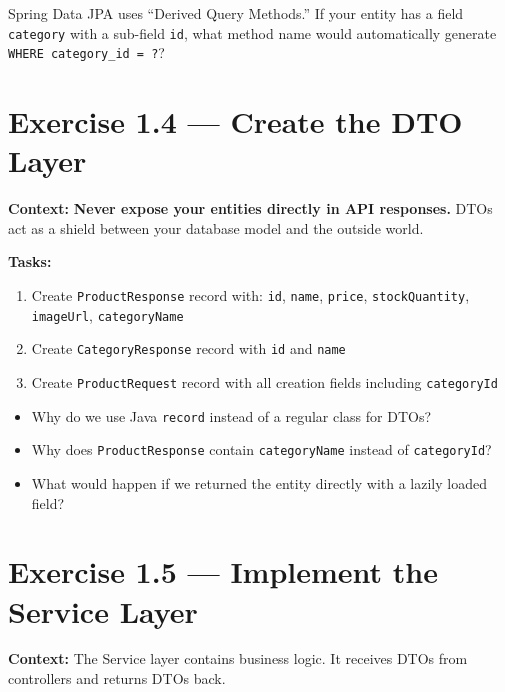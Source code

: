 \documentclass[12pt,a4paper]{report}
\begin{document}
\begin{thinkbox}
Spring Data JPA uses ``Derived Query Methods.'' If your entity has a field \texttt{category} with a sub-field \texttt{id}, what method name would automatically generate \texttt{WHERE category\_id = ?}?
\end{thinkbox}

\section{Exercise 1.4 --- Create the DTO Layer}

\textbf{Context:} \textbf{Never expose your entities directly in API responses.} DTOs act as a shield between your database model and the outside world.

\textbf{Tasks:}
\begin{enumerate}
    \item Create \texttt{ProductResponse} record with: \texttt{id}, \texttt{name}, \texttt{price}, \texttt{stockQuantity}, \texttt{imageUrl}, \texttt{categoryName}
    \item Create \texttt{CategoryResponse} record with \texttt{id} and \texttt{name}
    \item Create \texttt{ProductRequest} record with all creation fields including \texttt{categoryId}
\end{enumerate}

\begin{thinkbox}
\begin{itemize}
    \item Why do we use Java \texttt{record} instead of a regular class for DTOs?
    \item Why does \texttt{ProductResponse} contain \texttt{categoryName} instead of \texttt{categoryId}?
    \item What would happen if we returned the entity directly with a lazily loaded field?
\end{itemize}
\end{thinkbox}

\section{Exercise 1.5 --- Implement the Service Layer}

\textbf{Context:} The Service layer contains business logic. It receives DTOs from controllers and returns DTOs back.
\end{document}
